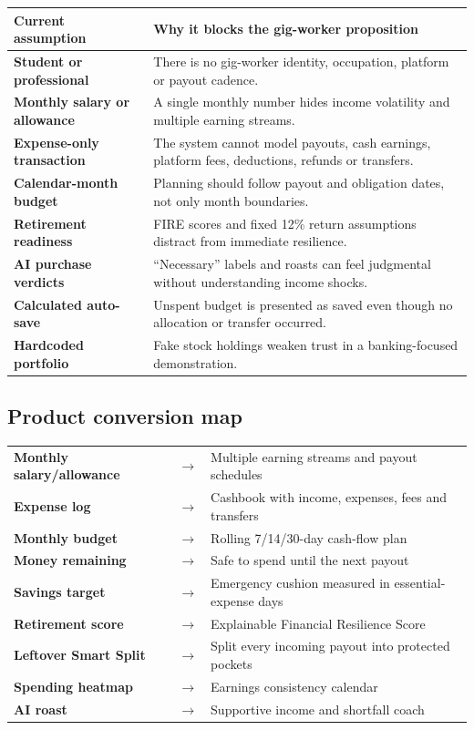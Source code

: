 \documentclass[10pt,a4paper]{article}
\begin{document}
\begin{tabularx}{\textwidth}{>{\bfseries}p{40mm} X}
Current assumption & Why it blocks the gig-worker proposition \\
\toprule
Student or professional & There is no gig-worker identity, occupation, platform or payout cadence. \\
Monthly salary or allowance & A single monthly number hides income volatility and multiple earning streams. \\
Expense-only transaction & The system cannot model payouts, cash earnings, platform fees, deductions, refunds or transfers. \\
Calendar-month budget & Planning should follow payout and obligation dates, not only month boundaries. \\
Retirement readiness & FIRE scores and fixed 12\% return assumptions distract from immediate resilience. \\
AI purchase verdicts & ``Necessary'' labels and roasts can feel judgmental without understanding income shocks. \\
Calculated auto-save & Unspent budget is presented as saved even though no allocation or transfer occurred. \\
Hardcoded portfolio & Fake stock holdings weaken trust in a banking-focused demonstration. \\
\bottomrule
\end{tabularx}

\subsection{Product conversion map}

\begin{tabularx}{\textwidth}{>{\bfseries}p{43mm} >{\bfseries\color{Accent}}p{7mm} X}
Monthly salary/allowance & $\rightarrow$ & Multiple earning streams and payout schedules \\
Expense log & $\rightarrow$ & Cashbook with income, expenses, fees and transfers \\
Monthly budget & $\rightarrow$ & Rolling 7/14/30-day cash-flow plan \\
Money remaining & $\rightarrow$ & Safe to spend until the next payout \\
Savings target & $\rightarrow$ & Emergency cushion measured in essential-expense days \\
Retirement score & $\rightarrow$ & Explainable Financial Resilience Score \\
Leftover Smart Split & $\rightarrow$ & Split every incoming payout into protected pockets \\
Spending heatmap & $\rightarrow$ & Earnings consistency calendar \\
AI roast & $\rightarrow$ & Supportive income and shortfall coach \\
\end{tabularx}
\end{document}
